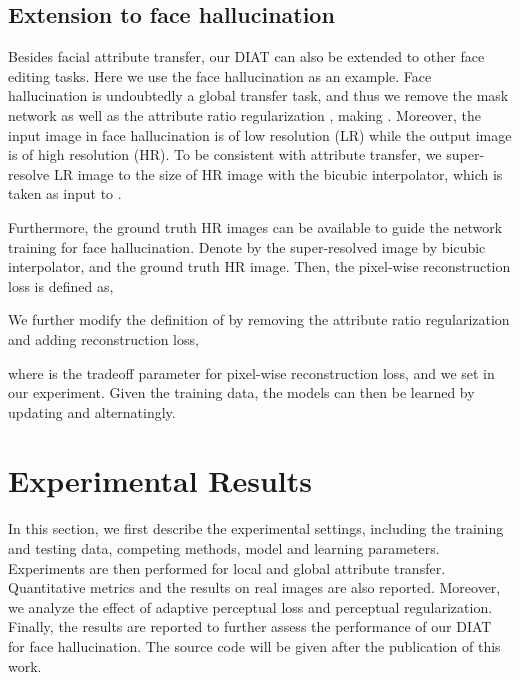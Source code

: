 \documentclass[journal]{IEEEtran}
\begin{document}
\subsection{Extension to face hallucination}\label{sec:facehallucinationmodel}
Besides facial attribute transfer, our DIAT can also be extended to other face editing tasks.
Here we use the  face hallucination as an example.
Face hallucination is undoubtedly a global transfer task, and thus we remove the mask network  as well as the attribute ratio regularization , making .
Moreover, the input image in face hallucination is of low resolution (LR) while the output image is of high resolution (HR).
To be consistent with attribute transfer, we super-resolve LR image to the size of HR image with the bicubic interpolator, which is taken as input to .



Furthermore, the ground truth HR images can be available to guide the network training for face hallucination.
Denote by  the super-resolved image by bicubic interpolator, and  the ground truth HR image.
Then, the pixel-wise reconstruction loss is defined as,

We further modify the definition of  by removing the attribute ratio regularization and adding reconstruction loss,

where  is the tradeoff parameter for pixel-wise reconstruction loss, and we set  in our experiment.
Given the training data, the models can then be learned by updating  and  alternatingly.













\section{Experimental Results}
\label{sec:exp}

In this section, we first describe the experimental settings, including the training and testing data, competing methods, model and learning parameters.
Experiments are then performed for local and global attribute transfer.
Quantitative metrics and the results on real images are also reported.
Moreover, we analyze the effect of adaptive perceptual loss and perceptual regularization.
Finally, the results are reported to further assess the performance of our DIAT for face hallucination.
The source code will be given after the publication of this work.
\end{document}
